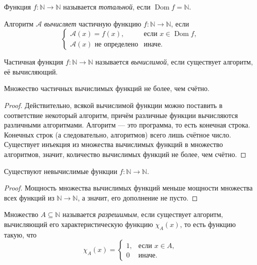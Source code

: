 \documentclass{article}
\begin{document}
    \begin{definition}
        Функция \(f: \mathbb{N} \to \mathbb{N}\) называется \textit{тотальной}, если \(\operatorname{Dom} f = \mathbb{N}.\)
    \end{definition}

    \begin{definition}
        Алгоритм \(\mathcal{A}\) \textit{вычисляет} частичную функцию \(f: \mathbb{N} \to \mathbb{N}\), если
        $$
            \begin{cases}
                \mathcal{A}(x) = f(x), & \text{если \(x \in \operatorname{Dom} f\),}\\
                \mathcal{A}(x) \text{ не определено} & \text{иначе.}
            \end{cases}
        $$
    \end{definition}

    \begin{definition}
        Частичная функция \(f: \mathbb{N} \to \mathbb{N}\) называется \textit{вычислимой}, если существует
        алгоритм, её вычисляющий.
    \end{definition}

    \begin{statement}
        Множество частичных вычислимых функций не более, чем счётно.
    \end{statement}
    \begin{proof}
        Действительно, всякой вычислимой функции можно поставить в соответствие некоторый алгоритм,
        причём различные функции вычисляются различными алгоритмами. Алгоритм --- это программа,
        то есть конечная строка. Конечных строк (а следовательно, алгоритмов) всего лишь счётное число.
        Существует инъекция из множества вычислимых функций в множество алгоритмов, значит, количество
        вычислимых функций не более, чем счётно.
    \end{proof}

    \begin{theorem}
        Существуют невычислимые функции \(f: \mathbb{N} \to \mathbb{N}\).
    \end{theorem}
    \begin{proof}
        Мощность множества вычислимых функций меньше мощности множества всех функций из \(\mathbb{N}
        \to \mathbb{N}\), а значит, его дополнение не пусто.
    \end{proof}

    \begin{definition}
        Множество \(A \subseteq \mathbb{N}\) называется \textit{разрешимым}, если существует алгоритм, вычисляющий
        его характеристическую функцию \(\chi_A(x)\), то есть функцию такую, что
        $$
            \chi_A(x) =
            \begin{cases}
                1, & \text{если \(x \in A\),}\\
                0 & \text{иначе.}
            \end{cases}
        $$
    \end{definition}
\end{document}
